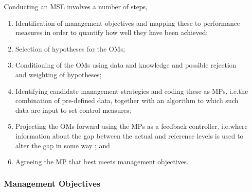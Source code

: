 \documentclass[%
nonumbib,      %
%
]{nrc1}                          %
\begin{document}

Conducting an MSE involves a number of steps, \cite[i.e. after][]{punt2007developing}

\begin{enumerate}
 \item Identification of management objectives and mapping these to performance measures in order to quantify how well they have been achieved;
 \item Selection of hypotheses for the OMs;
 \item Conditioning of the OMs using data and knowledge and possible rejection and weighting of hypotheses;
 \item Identifying candidate management strategies and coding these as MPs, i.e.the combination of pre-defined data, together with an algorithm to which such data are input to set control measures;
 \item Projecting the OMs forward using the MPs as a feedback controller, i.e.where information about the gap between the actual and reference levels is used to alter the gap in some way \citep{ramaprasad1983definition}; and
 \item Agreeing the MP that best meets management objectives.
\end{enumerate}

\subsubsection*{Management Objectives} 





\end{document}
